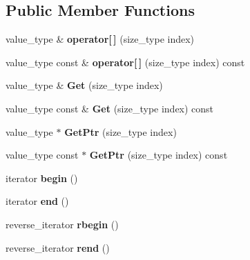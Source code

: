 \subsection*{Public Member Functions}
\begin{DoxyCompactItemize}
\item 
\hypertarget{classlsf_1_1container_1_1Array_a45854c2c3223d87bca263ba5f72aba9c}{
value\_\-type \& {\bfseries operator\mbox{[}$\,$\mbox{]}} (size\_\-type index)}
\label{classlsf_1_1container_1_1Array_a45854c2c3223d87bca263ba5f72aba9c}

\item 
\hypertarget{classlsf_1_1container_1_1Array_a3fabde1949628c66edfa067b2d2c6a25}{
value\_\-type const \& {\bfseries operator\mbox{[}$\,$\mbox{]}} (size\_\-type index) const }
\label{classlsf_1_1container_1_1Array_a3fabde1949628c66edfa067b2d2c6a25}

\item 
\hypertarget{classlsf_1_1container_1_1Array_a333a923d5ffa710ae435ee9ffe7c18de}{
value\_\-type \& {\bfseries Get} (size\_\-type index)}
\label{classlsf_1_1container_1_1Array_a333a923d5ffa710ae435ee9ffe7c18de}

\item 
\hypertarget{classlsf_1_1container_1_1Array_aac5ff1d698f3828de7021a621642a7ae}{
value\_\-type const \& {\bfseries Get} (size\_\-type index) const }
\label{classlsf_1_1container_1_1Array_aac5ff1d698f3828de7021a621642a7ae}

\item 
\hypertarget{classlsf_1_1container_1_1Array_a1d4b4eee3992b77c4243f7d6c0fd1507}{
value\_\-type $\ast$ {\bfseries GetPtr} (size\_\-type index)}
\label{classlsf_1_1container_1_1Array_a1d4b4eee3992b77c4243f7d6c0fd1507}

\item 
\hypertarget{classlsf_1_1container_1_1Array_ab133d2e3d57758d84ea459d862f37fc7}{
value\_\-type const $\ast$ {\bfseries GetPtr} (size\_\-type index) const }
\label{classlsf_1_1container_1_1Array_ab133d2e3d57758d84ea459d862f37fc7}

\item 
\hypertarget{classlsf_1_1container_1_1Array_a31650fac5648064ecd3289af84275f95}{
iterator {\bfseries begin} ()}
\label{classlsf_1_1container_1_1Array_a31650fac5648064ecd3289af84275f95}

\item 
\hypertarget{classlsf_1_1container_1_1Array_a1ddad9e70405f22d3f103ec1340ac5e0}{
iterator {\bfseries end} ()}
\label{classlsf_1_1container_1_1Array_a1ddad9e70405f22d3f103ec1340ac5e0}

\item 
\hypertarget{classlsf_1_1container_1_1Array_a2fb3d706f501273fc4e71f92484c0895}{
reverse\_\-iterator {\bfseries rbegin} ()}
\label{classlsf_1_1container_1_1Array_a2fb3d706f501273fc4e71f92484c0895}

\item 
\hypertarget{classlsf_1_1container_1_1Array_a69cd4379aa204f3627403a2d7b740955}{
reverse\_\-iterator {\bfseries rend} ()}
\label{classlsf_1_1container_1_1Array_a69cd4379aa204f3627403a2d7b740955}

\end{DoxyCompactItemize}
